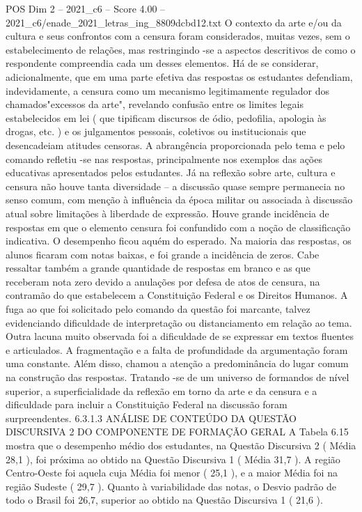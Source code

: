 \begin{textsample}{POS Dim 2 – 2021\_c6 – Score 4.00 – 2021\_c6/enade\_2021\_letras\_ing\_8809dcbd12.txt}
O contexto da arte e/ou da cultura e seus confrontos com a censura foram considerados, muitas vezes, sem o estabelecimento de relações, mas restringindo -se a aspectos descritivos de como o respondente compreendia cada um desses elementos.
Há de se considerar, adicionalmente, que em uma parte efetiva das respostas os estudantes defendiam, indevidamente, a censura como um mecanismo legitimamente regulador dos chamados"excessos da arte", revelando confusão entre os limites legais estabelecidos em lei ( que tipificam discursos de ódio, pedofilia, apologia às drogas, etc. ) e os julgamentos pessoais, coletivos ou institucionais que desencadeiam atitudes censoras.
A abrangência proporcionada pelo tema e pelo comando refletiu -se nas respostas, principalmente nos exemplos das ações educativas apresentados pelos estudantes.
Já na reflexão sobre arte, cultura e censura não houve tanta diversidade – a discussão quase sempre permanecia no senso comum, com menção à influência da época militar ou associada à discussão atual sobre limitações à liberdade de expressão.
Houve grande incidência de respostas em que o elemento censura foi confundido com a noção de classificação indicativa.
O desempenho ficou aquém do esperado.
Na maioria das respostas, os alunos ficaram com notas baixas, e foi grande a incidência de zeros.
Cabe ressaltar também a grande quantidade de respostas em branco e as que receberam nota zero devido a anulações por defesa de atos de censura, na contramão do que estabelecem a Constituição Federal e os Direitos Humanos.
A fuga ao que foi solicitado pelo comando da questão foi marcante, talvez evidenciando dificuldade de interpretação ou distanciamento em relação ao tema.
Outra lacuna muito observada foi a dificuldade de se expressar em textos fluentes e articulados.
A fragmentação e a falta de profundidade da argumentação foram uma constante.
Além disso, chamou a atenção a predominância do lugar comum na construção das respostas.
Tratando -se de um universo de formandos de nível superior, a superficialidade da reflexão em torno da arte e da censura e a dificuldade para incluir a Constituição Federal na discussão foram surpreendentes. 6.3.1.3 ANÁLISE DE CONTEÚDO DA QUESTÃO DISCURSIVA 2 DO COMPONENTE DE FORMAÇÃO GERAL A Tabela 6.15 mostra que o desempenho médio dos estudantes, na Questão Discursiva 2 ( Média 28,1 ), foi próxima ao obtido na Questão Discursiva 1 ( Média 31,7 ).
A região Centro-Oeste foi aquela cuja Média foi menor ( 25,1 ), e a maior Média foi na região Sudeste ( 29,7 ).
Quanto à variabilidade das notas, o Desvio padrão de todo o Brasil foi 26,7, superior ao obtido na Questão Discursiva 1 ( 21,6 ).

\end{textsample}
